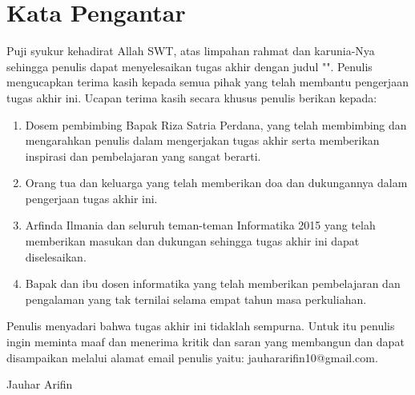 \clearpage

\chapter*{Kata Pengantar}

\par Puji syukur kehadirat Allah SWT, atas limpahan rahmat dan karunia-Nya sehingga penulis dapat menyelesaikan tugas akhir dengan judul "\thetitle". Penulis mengucapkan terima kasih kepada semua pihak yang telah membantu pengerjaan tugas akhir ini. Ucapan terima kasih secara khusus penulis berikan kepada:

\begin{enumerate}
    \item Dosem pembimbing Bapak Riza Satria Perdana, yang telah membimbing dan mengarahkan penulis dalam mengerjakan tugas akhir serta memberikan inspirasi dan pembelajaran yang sangat berarti.
    \item Orang tua dan keluarga yang telah memberikan doa dan dukungannya dalam pengerjaan tugas akhir ini.
    \item Arfinda Ilmania dan seluruh teman-teman Informatika 2015 yang telah memberikan masukan dan dukungan sehingga tugas akhir ini dapat diselesaikan.
    \item Bapak dan ibu dosen informatika yang telah memberikan pembelajaran dan pengalaman yang tak ternilai selama empat tahun masa perkuliahan.
\end{enumerate}

\par Penulis menyadari bahwa tugas akhir ini tidaklah sempurna. Untuk itu penulis ingin meminta maaf dan menerima kritik dan saran yang membangun dan dapat disampaikan melalui alamat email penulis yaitu: jauhararifin10@gmail.com.

\begin{flushright}
Jauhar Arifin
\end{flushright}

\clearpage